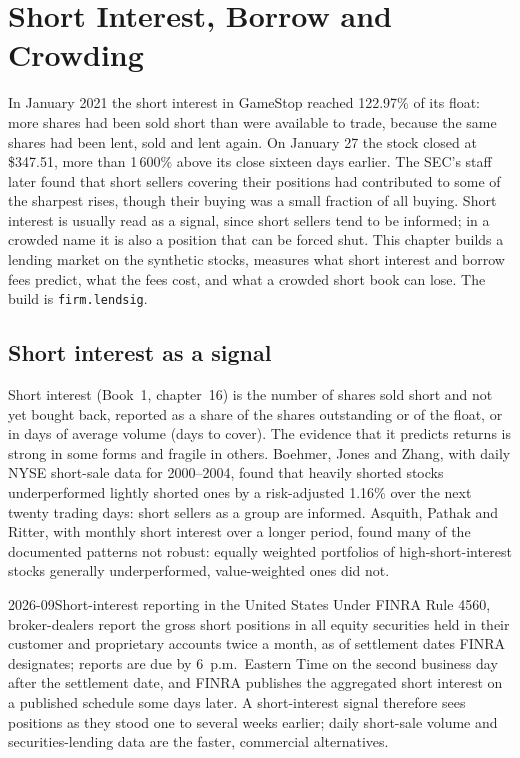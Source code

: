 \chapter{Short Interest, Borrow and Crowding}\label{ch:s1:short-interest-borrow-and-crowding}

In January 2021 the short interest in GameStop reached 122.97\% of its float: more shares had been sold short than were available to trade, because the
same shares had been lent, sold and lent again. On January 27 the stock closed at \$347.51, more than 1\,600\% above its close sixteen days earlier. The SEC's
staff later found that short sellers covering their positions had contributed to some of the sharpest rises, though their buying was a small fraction of
all buying. Short interest is usually read as a signal, since short sellers tend to be informed; in a crowded name it is also a position that can be forced
shut. This chapter builds a lending market on the synthetic stocks, measures what short interest and borrow fees predict, what the fees cost, and what a
crowded short book can lose. The build is \texttt{firm.lendsig}.

\section{Short interest as a signal}

Short interest (Book~1, chapter~16) is the number of shares sold short and not yet bought back, reported as a share of the shares outstanding or of the float,
or in days of average volume (days to cover). The evidence that it predicts returns is strong in some forms and fragile in others. Boehmer, Jones and Zhang,
with daily NYSE short-sale data for 2000--2004, found that heavily shorted stocks underperformed lightly shorted ones by a risk-adjusted 1.16\% over the next
twenty trading days: short sellers as a group are informed. Asquith, Pathak and Ritter, with monthly short interest over a longer period, found many of the
documented patterns not robust: equally weighted portfolios of high-short-interest stocks generally underperformed, value-weighted ones did not.

\begin{dated}{2026-09}{Short-interest reporting in the United States}\label{dat:s1:short-interest-borrow-and-crowding:finra}
Under FINRA Rule 4560, broker-dealers report the gross short positions in all equity securities held in their customer and proprietary accounts twice a
month, as of settlement dates FINRA designates; reports are due by 6~p.m.\ Eastern Time on the second business day after the settlement date, and FINRA
publishes the aggregated short interest on a published schedule some days later. A short-interest signal therefore sees positions as they stood one to
several weeks earlier; daily short-sale volume and securities-lending data are the faster, commercial alternatives.
\end{dated}

